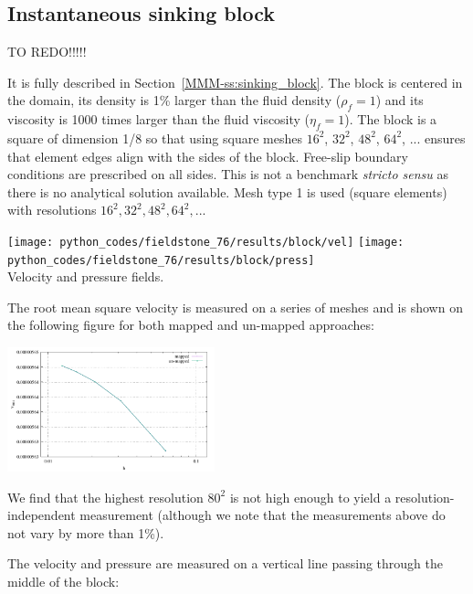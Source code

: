 \newpage
\subsection*{Instantaneous sinking block}

{\color{red} TO REDO!!!!!}

It is fully described in Section~\ref{MMM-ss:sinking_block}.
The block is centered in the domain, its density is 1\% larger than the 
fluid density ($\rho_f=1$) and its viscosity is 1000 times larger than 
the fluid viscosity ($\eta_f=1$).
The block is a square of dimension 1/8 so that using square meshes $16^2$, 
$32^2$, $48^2$, $64^2$, ... ensures that element edges align with the 
sides of the block.
Free-slip boundary conditions are prescribed on all sides.
This is not a benchmark {\it stricto sensu} as there is no analytical solution
available. 
Mesh type 1 is used (square elements) with resolutions $16^2, 32^2, 48^2, 64^2, ...$

\begin{center}
\texttt{[image: python\_codes/fieldstone\_76/results/block/vel]}
\texttt{[image: python\_codes/fieldstone\_76/results/block/press]}\\
{\captionfont Velocity and pressure fields.}
\end{center}

The root mean square velocity is measured on a series of meshes 
and is shown on the following figure for both mapped and un-mapped approaches: 

\begin{center}
\includegraphics[width=6cm]{python_codes/fieldstone_76/results/block/vrms.pdf}
\end{center}

We find that the highest resolution $80^2$ is not high enough to yield a resolution-independent
measurement (although we note that the measurements above do not vary by more than 1\%). 

The velocity and pressure are measured on a vertical line passing through the 
middle of the block:

